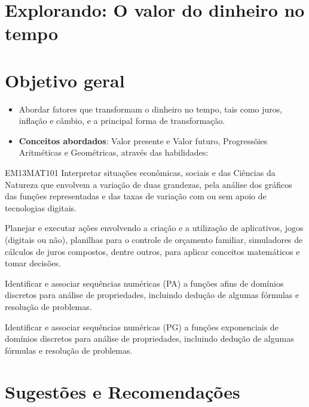 \begin{paginatexto}
\section*{Explorando: O valor do dinheiro no tempo}

\section*{Objetivo geral}

\begin{itemize}
\item Abordar fatores que transformam o dinheiro no tempo, tais como juros, inflação e câmbio, e a principal forma de transformação.

\item \textbf{Conceitos abordados}: Valor presente e Valor futuro, Progressõies Aritméticas e Geométricas, através das habilidades:
\end{itemize}

\begin{habilities}{EM13MAT101}
 Interpretar situações econômicas, sociais e das Ciências da Natureza
que envolvem a variação de duas grandezas, pela análise dos gráficos das funções representadas e das taxas de variação com ou sem apoio de tecnologias digitais.

Planejar e executar ações envolvendo a criação e a utilização de aplicativos, jogos (digitais ou não), planilhas para o controle de orçamento familiar, simuladores de cálculos de juros compostos, dentre outros, para aplicar conceitos matemáticos e tomar decisões. 

Identificar e associar sequências numéricas (PA) a funções afins de domínios discretos para análise de propriedades, incluindo dedução de algumas fórmulas e resolução de problemas.

Identificar e associar sequências numéricas (PG) a funções exponenciais de domínios discretos para análise de propriedades, incluindo dedução de algumas fórmulas e resolução de problemas.
\end{habilities}

\section*{Sugestões e Recomendações}

\end{paginatexto}
